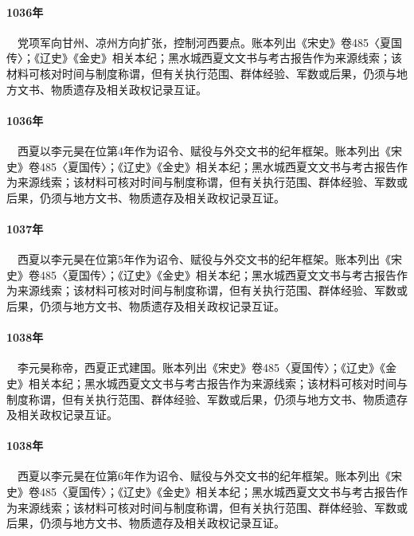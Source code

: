 \paragraph{1036年}　党项军向甘州、凉州方向扩张，控制河西要点。账本列出《宋史》卷485〈夏国传〉；《辽史》《金史》相关本纪；黑水城西夏文文书与考古报告作为来源线索；该材料可核对时间与制度称谓，但有关执行范围、群体经验、军数或后果，仍须与地方文书、物质遗存及相关政权记录互证。

\paragraph{1036年}　西夏以李元昊在位第4年作为诏令、赋役与外交文书的纪年框架。账本列出《宋史》卷485〈夏国传〉；《辽史》《金史》相关本纪；黑水城西夏文文书与考古报告作为来源线索；该材料可核对时间与制度称谓，但有关执行范围、群体经验、军数或后果，仍须与地方文书、物质遗存及相关政权记录互证。

\paragraph{1037年}　西夏以李元昊在位第5年作为诏令、赋役与外交文书的纪年框架。账本列出《宋史》卷485〈夏国传〉；《辽史》《金史》相关本纪；黑水城西夏文文书与考古报告作为来源线索；该材料可核对时间与制度称谓，但有关执行范围、群体经验、军数或后果，仍须与地方文书、物质遗存及相关政权记录互证。

\paragraph{1038年}　李元昊称帝，西夏正式建国。账本列出《宋史》卷485〈夏国传〉；《辽史》《金史》相关本纪；黑水城西夏文文书与考古报告作为来源线索；该材料可核对时间与制度称谓，但有关执行范围、群体经验、军数或后果，仍须与地方文书、物质遗存及相关政权记录互证。

\paragraph{1038年}　西夏以李元昊在位第6年作为诏令、赋役与外交文书的纪年框架。账本列出《宋史》卷485〈夏国传〉；《辽史》《金史》相关本纪；黑水城西夏文文书与考古报告作为来源线索；该材料可核对时间与制度称谓，但有关执行范围、群体经验、军数或后果，仍须与地方文书、物质遗存及相关政权记录互证。


